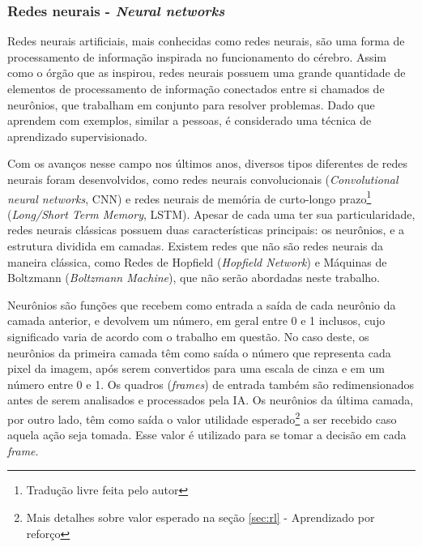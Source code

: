 \subsubsection{Redes neurais - \textit{Neural networks}}
\label{sec:nn}

Redes neurais artificiais, mais conhecidas como redes neurais, são uma forma de processamento de informação inspirada no funcionamento do cérebro. Assim como o órgão que as inspirou, redes neurais possuem uma grande quantidade de elementos de processamento de informação conectados entre si chamados de neurônios, que trabalham em conjunto para resolver problemas. Dado que aprendem com exemplos, similar a pessoas, é considerado uma técnica de aprendizado supervisionado.

Com os avanços nesse campo nos últimos anos, diversos tipos diferentes de redes neurais foram desenvolvidos, como redes neurais convolucionais (\textit{Convolutional neural networks}, CNN) e redes neurais de memória de curto-longo prazo\footnote{Tradução livre feita pelo autor} (\textit{Long/Short Term Memory}, LSTM). Apesar de cada uma ter sua particularidade, redes neurais clássicas possuem duas características principais: os neurônios, e a estrutura dividida em camadas. Existem redes que não são redes neurais da maneira clássica, como Redes de Hopfield (\textit{Hopfield Network}) e Máquinas de Boltzmann (\textit{Boltzmann Machine}), que não serão abordadas neste trabalho.

Neurônios são funções que recebem como entrada a saída de cada neurônio da camada anterior, e devolvem um número, em geral entre 0 e 1 inclusos, cujo significado varia de acordo com o trabalho em questão. No caso deste, os neurônios da primeira camada têm como saída o número que representa cada pixel da imagem, após serem convertidos para uma escala de cinza e em um número entre 0 e 1. Os quadros (\textit{frames}) de entrada também são redimensionados antes de serem analisados e processados pela IA. Os neurônios da última camada, por outro lado, têm como saída o valor utilidade esperado\footnote{Mais detalhes sobre valor esperado na seção \ref{sec:rl} - Aprendizado por reforço} a ser recebido caso aquela ação seja tomada. Esse valor é utilizado para se tomar a decisão em cada \textit{frame}. 

